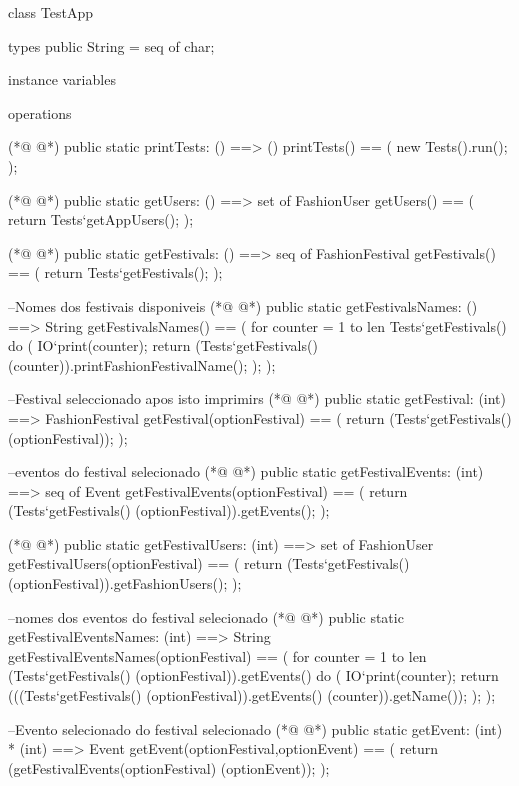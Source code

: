 \begin{vdmpp}[breaklines=true]
class TestApp

types
public String = seq of char;

instance variables

operations

(*@
\label{printTests:10}
@*)
public static printTests: () ==> ()
 printTests() == 
 (
    new Tests().run();   
   );
   
   
(*@
\label{getUsers:17}
@*)
 public static getUsers: () ==> set of FashionUser
 getUsers() ==
 ( 
 return Tests`getAppUsers();
 );
 
  
(*@
\label{getFestivals:24}
@*)
  public static getFestivals: () ==> seq of FashionFestival
  getFestivals() ==
  (
   return Tests`getFestivals();
  );
   
  --Nomes dos festivais disponiveis
(*@
\label{getFestivalsNames:31}
@*)
  public static getFestivalsNames: () ==> String
 getFestivalsNames() ==
 ( 
 for counter = 1 to len Tests`getFestivals() do (
   IO`print(counter);
    return (Tests`getFestivals() (counter)).printFashionFestivalName();
   );
  );   
  
  --Festival seleccionado apos isto imprimirs
(*@
\label{getFestival:41}
@*)
  public static getFestival: (int) ==> FashionFestival
  getFestival(optionFestival) ==
  ( 
  return (Tests`getFestivals() (optionFestival));
  );
  
  --eventos do festival selecionado
(*@
\label{getFestivalEvents:48}
@*)
  public static getFestivalEvents: (int) ==> seq of Event
  getFestivalEvents(optionFestival) ==
  ( 
  return (Tests`getFestivals() (optionFestival)).getEvents();
  );
  
(*@
\label{getFestivalUsers:54}
@*)
  public static getFestivalUsers: (int) ==> set of FashionUser
  getFestivalUsers(optionFestival) ==
  ( 
  return (Tests`getFestivals() (optionFestival)).getFashionUsers();
  );
  
  
    
  --nomes dos eventos do festival selecionado
(*@
\label{getFestivalEventsNames:63}
@*)
  public static getFestivalEventsNames: (int) ==> String
  getFestivalEventsNames(optionFestival) ==
  ( 
    for counter = 1 to len (Tests`getFestivals() (optionFestival)).getEvents() do (
    IO`print(counter);
    return (((Tests`getFestivals() (optionFestival)).getEvents() (counter)).getName());
    );
  );

 --Evento selecionado do festival selecionado
(*@
\label{getEvent:73}
@*)
 public static getEvent: (int) * (int) ==> Event
  getEvent(optionFestival,optionEvent) ==
  ( 
  return (getFestivalEvents(optionFestival) (optionEvent));
  );
  

\end{vdmpp}

